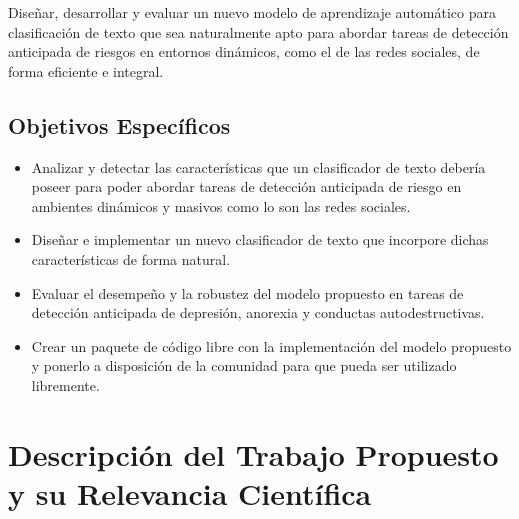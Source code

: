 Diseñar, desarrollar y evaluar un nuevo modelo de aprendizaje automático para clasificación de texto que sea naturalmente apto para abordar tareas de detección anticipada de riesgos en entornos dinámicos, como el de las redes sociales, de forma eficiente e integral.

\subsection{Objetivos Específicos}

\begin{itemize}
    \item[\textbf{O1:}] Analizar y detectar las características que  un clasificador de texto debería poseer para poder abordar tareas de detección anticipada de riesgo en ambientes dinámicos y masivos como lo son las redes sociales.
    \item[\textbf{O2:}] Diseñar e implementar un nuevo clasificador de texto que incorpore dichas características de forma natural.
    \item[\textbf{O3:}] Evaluar el desempeño y la robustez del modelo propuesto en tareas de detección anticipada de depresión, anorexia y  conductas autodestructivas.
    \item[\textbf{O4:}] Crear un paquete de código libre con la implementación del modelo propuesto y ponerlo a disposición de la comunidad para que pueda ser utilizado libremente.
\end{itemize}

\section{Descripción del Trabajo Propuesto y su Relevancia Científica}

